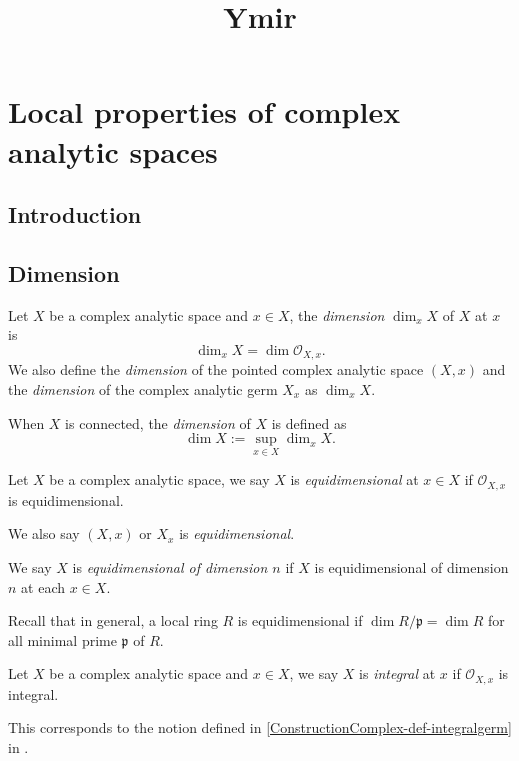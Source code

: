 
\title{Ymir}

\maketitle
\tableofcontents

\chapter*{Local properties of complex analytic spaces}\label{chap-propcomplex}

\section{Introduction}\label{sec-introduction-propertycomplex}


\section{Dimension}

\begin{definition}
    Let $X$ be a complex analytic space and $x\in X$, the \emph{dimension} $\dim_x X$ of $X$ at $x$ is 
    \[
        \dim_x X=\dim \mathcal{O}_{X,x}.
    \]
    We also define the \emph{dimension} of the pointed complex analytic space $(X,x)$ and the \emph{dimension} of the complex analytic germ $X_x$ as $\dim_x X$.

    When $X$ is connected, the \emph{dimension} of $X$ is defined as
    \[
        \dim X:=\sup_{x\in X}\dim_x X.  
    \]
\end{definition}

\begin{definition}
    Let $X$ be a complex analytic space, we say $X$ is \emph{equidimensional} at $x\in X$ if $\mathcal{O}_{X,x}$ is equidimensional.

    We also say $(X,x)$ or $X_x$ is \emph{equidimensional}.

    We say $X$ is \emph{equidimensional of dimension $n$} if $X$ is equidimensional of dimension $n$ at each $x\in X$.
\end{definition}
Recall that in general, a local ring $R$ is equidimensional if $\dim R/\mathfrak{p}=\dim R$ for all minimal prime $\mathfrak{p}$ of $R$.

\begin{definition}
    Let $X$ be a complex analytic space and $x\in X$, we say $X$ is \emph{integral} at $x$ if $\mathcal{O}_{X,x}$ is integral.
\end{definition}
This corresponds to the notion defined in \cref{ConstructionComplex-def-integralgerm} in .

